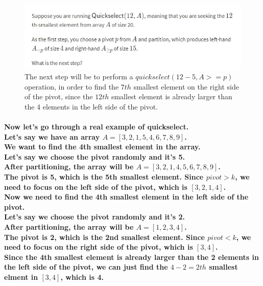 \documentclass{article}
\begin{document}
\begin{figure}[H]
    \includegraphics[width=\textwidth]{quickselectlittlequiz.png}
    \caption{The next step will be to perform a $quickselect(12-5,A>=p)$ operation,
    in order to find the $7th$ smallest element on the right side of the pivot,
    since the $12th$ smallest element is already larger than the 4 elements
    in the left side of the pivot.\\}
\end{figure}

\paragraph{Now let's go through a real example of quickselect.\\
Let's say we have an array $A = [3,2,1,5,4,6,7,8,9]$.\\
We want to find the 4th smallest element in the array.\\
Let's say we choose the pivot randomly and it's 5.\\
After partitioning, the array will be $A = [3,2,1,4,5,6,7,8,9]$.\\
The pivot is 5, which is the 5th smallest element. Since $pivot > k$,
we need to focus on the left side of the pivot, which is $[3,2,1,4]$.\\
Now we need to find the 4th smallest element in the left side of the pivot.\\
Let's say we choose the pivot randomly and it's 2.\\
After partitioning, the array will be $A = [1,2,3,4]$.\\
The pivot is 2, which is the 2nd smallest element. Since $pivot < k$,
we need to focus on the right side of the pivot, which is $[3,4]$.\\
Since the 4th smallest element is already larger than the 2 elements 
in the left side of the pivot, we can just find the $4-2=2th$ smallest elment in
$[3,4]$, which is 4.\\}
\end{document}
